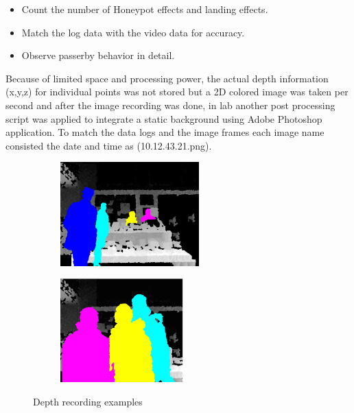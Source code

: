 \begin{enumerate}
\begin{itemize}
\begin{itemize}
        \end{itemize}

\item Count the number of Honeypot effects and landing effects.
\item Match the log data with the video data for accuracy.
\item Observe passerby behavior in detail.
\end{itemize}

Because of limited space and processing power, the actual depth information (x,y,z) for individual points was not stored but a 2D colored image was taken per second and after the image recording was done, in lab another post processing script was applied to integrate a static background using Adobe Photoshop application. To match the data logs and the image frames each image name consisted the date and time as (10.12.43.21.png).


\begin{figure}[H]
    \centering
    \begin{subfigure}[H]{0.45\textwidth}
        \centering
        \includegraphics[width=\textwidth,height=4cm]{Figures/8/d1}
        \caption{}
        \label{fig:d1}
    \end{subfigure}
    \begin{subfigure}[H]{0.45\textwidth}
        \centering
        \includegraphics[width=\textwidth,height=4cm]{Figures/8/d2}
        \caption{}
        \label{fig:d2}
    \end{subfigure}
    \caption{Depth recording examples}
    \label{fig:DepthRecordedImages}
\end{figure}




\end{enumerate}

